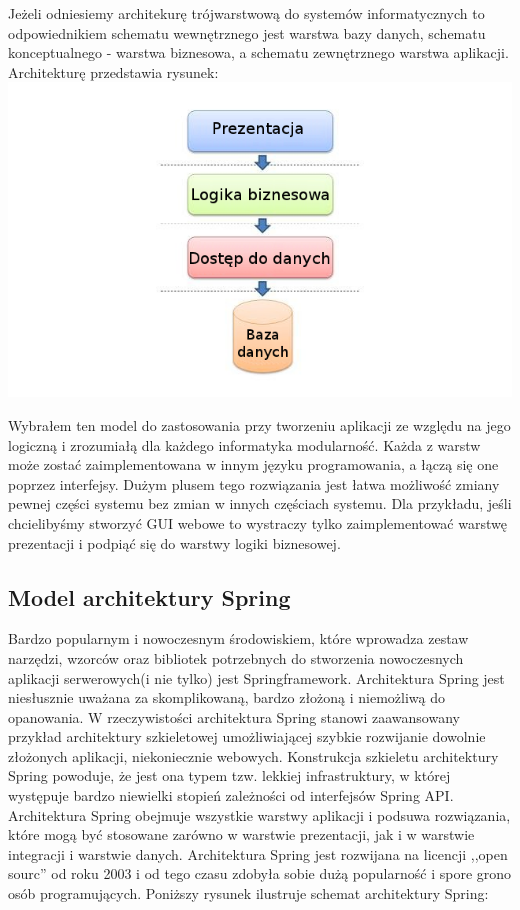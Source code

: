 Jeżeli odniesiemy architekurę trójwarstwową do systemów informatycznych to odpowiednikiem schematu wewnętrznego jest warstwa bazy danych, schematu konceptualnego - warstwa biznesowa, a schematu zewnętrznego warstwa aplikacji. Architekturę przedstawia rysunek:
\includegraphics[scale=0.31]{images/3layer-architect}

Wybrałem ten model do zastosowania przy tworzeniu aplikacji ze względu na jego logiczną i zrozumiałą dla każdego informatyka modularność. Każda z warstw może zostać zaimplementowana w innym języku programowania, a łączą się one poprzez interfejsy. Dużym plusem tego rozwiązania jest łatwa możliwość zmiany pewnej części systemu bez zmian w innych częściach systemu. Dla przykładu, jeśli chcielibyśmy stworzyć GUI webowe to wystraczy tylko zaimplementować warstwę prezentacji i podpiąć się do warstwy logiki biznesowej.

\subsection{Model architektury Spring}
\label{sec:modelArchitekturySpring}
Bardzo popularnym i nowoczesnym środowiskiem, które wprowadza zestaw narzędzi, wzorców oraz bibliotek potrzebnych do stworzenia nowoczesnych aplikacji serwerowych(i nie tylko) jest Springframework. Architektura Spring jest niesłusznie uważana za skomplikowaną, bardzo złożoną i niemożliwą do opanowania. W rzeczywistości architektura Spring stanowi zaawansowany przykład architektury szkieletowej umożliwiającej szybkie rozwijanie dowolnie złożonych aplikacji, niekoniecznie webowych. Konstrukcja szkieletu architektury Spring powoduje, że jest ona typem tzw. lekkiej infrastruktury, w której występuje bardzo niewielki stopień zależności od interfejsów Spring API. Architektura Spring obejmuje wszystkie warstwy aplikacji i podsuwa rozwiązania, które mogą być stosowane zarówno w warstwie prezentacji, jak i w warstwie integracji i warstwie danych. Architektura Spring jest rozwijana na licencji ,,open sourc'' od roku 2003 i od tego czasu zdobyła sobie dużą popularność i spore grono osób programujących. Poniższy rysunek ilustruje schemat architektury Spring:

